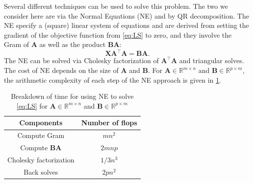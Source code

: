 \documentclass{article}
\newcommand{\mat}[1]{\mathbf{#1}}
\begin{document}
Several different techniques can be used to solve this problem.
The two we consider here are via the Normal Equations (NE) and by QR decomposition.
The NE specify a (square) linear system of equations and are derived from setting the gradient of the objective function from \cref{eq:LS} to zero, and they involve the Gram of $\mat{A}$ as well as the product $\mat{B}\mat{A}$:
\begin{equation}
\label{eq:NE}
\mat{X}\mat{A}^\top\mat{A} = \mat{B}\mat{A}.
\end{equation}
The NE can be solved via Cholesky factorization of $\mat{A}^\top\mat{A}$ and triangular solves.
The cost of NE depends on the size of $\mat{A}$ and $\mat{B}$. 
For $\mat{A} \in \mathbb{R}^{m \times n}$ and $\mat{B} \in \mathbb{R}^{p \times m}$, the arithmetic complexity of each step of the NE approach is given in \cref{tab:NE-time}.
\begin{table}[!ht]
  \centering
  \begin{tabular}{|c|c|}
    \hline
    Components & Number of flops\\
    \hline
    Compute Gram & $mn^2$ \\
    Compute $\mat{B}\mat{A}$ & $2mnp$\\
    Cholesky factorization & $1/3n^3$ \\
    Back solves & $2pn^2$ \\
    \hline
  \end{tabular}
  \caption{Breakdown of time for using NE to solve \cref{eq:LS} for $\mat{A} \in \mathbb{R}^{m \times n}$ and $\mat{B} \in \mathbb{R}^{p \times m}$}
  \label{tab:NE-time}
\end{table}
\end{document}
